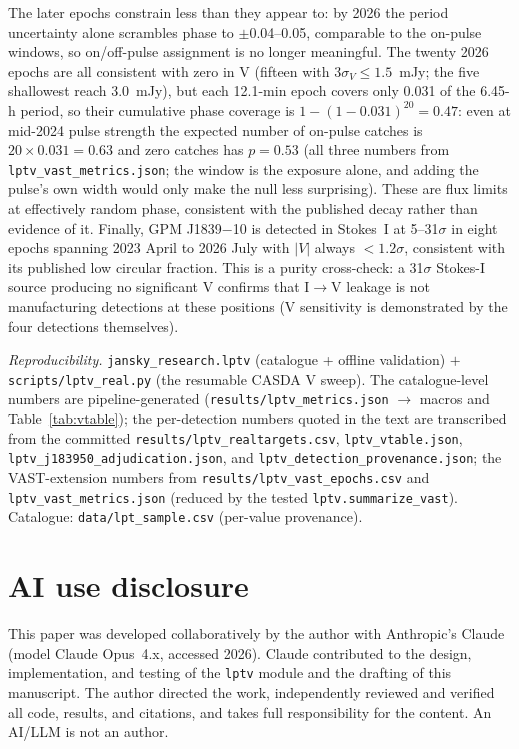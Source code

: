 \documentclass[twocolumn]{aastex631}
\newcommand{\code}[1]{\texttt{#1}}
\begin{document}
The later epochs constrain less than they appear to: by 2026 the period uncertainty alone
scrambles phase to $\pm$0.04--0.05, comparable to the on-pulse windows, so on/off-pulse
assignment is no longer meaningful. The twenty 2026 epochs are all consistent with zero in
V (fifteen with $3\sigma_V \le 1.5$~mJy; the five shallowest reach 3.0~mJy), but each
12.1-min epoch covers only 0.031 of the 6.45-h period, so their cumulative phase coverage
is $1-(1-0.031)^{20} = 0.47$: even at mid-2024 pulse strength the expected number of
on-pulse catches is $20 \times 0.031 = 0.63$ and zero catches has $p = 0.53$ (all three
numbers from \code{lptv\_vast\_metrics.json}; the window is the exposure alone, and adding
the pulse's own width would only make the null less surprising). These are flux limits at
effectively random phase, consistent with the published decay rather than evidence of it. Finally, GPM
J1839$-$10 \citep{hurleywalker2023} is detected in Stokes~I at 5--31$\sigma$ in eight
epochs spanning 2023 April to 2026 July with $|V|$ always $<1.2\sigma$, consistent with
its published low circular fraction. This is a purity cross-check: a 31$\sigma$
Stokes-I source producing no significant V confirms that I$\to$V leakage is not
manufacturing detections at these positions (V sensitivity is demonstrated by the
four detections themselves).

\textit{Reproducibility.} \code{jansky\_research.lptv} (catalogue + offline validation) $+$
\code{scripts/lptv\_real.py} (the resumable CASDA V sweep). The catalogue-level numbers are
pipeline-generated (\code{results/lptv\_metrics.json} $\to$ macros and Table~\ref{tab:vtable});
the per-detection numbers quoted in the text are transcribed from the committed
\code{results/lptv\_realtargets.csv}, \code{lptv\_vtable.json},
\code{lptv\_j183950\_adjudication.json}, and \code{lptv\_detection\_provenance.json};
the VAST-extension numbers from \code{results/lptv\_vast\_epochs.csv} and
\code{lptv\_vast\_metrics.json} (reduced by the tested \code{lptv.summarize\_vast}).
Catalogue: \code{data/lpt\_sample.csv} (per-value provenance).

\section*{AI use disclosure}
This paper was developed collaboratively by the author with Anthropic's Claude
\citep{anthropicclaude} (model Claude Opus~4.x, accessed 2026). Claude contributed to the design,
implementation, and testing of the \code{lptv} module and the drafting of this manuscript. The
author directed the work, independently reviewed and verified all code, results, and citations, and
takes full responsibility for the content. An AI/LLM is not an author.
\end{document}
